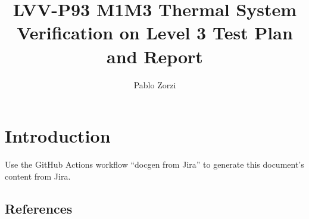 \documentclass[DM,lsstdraft,toc]{lsstdoc}
\begin{document}
\def\milestoneName{M1M3 Thermal System Verification on Level 3}
\def\milestoneId{LVV-P93}
\def\product{Data Management}


\title{LVV-P93 M1M3 Thermal System Verification on Level 3 Test Plan and Report}
\setDocRef{\lsstDocType-\lsstDocNum}
\date{\vcsDate}
\author{Pablo Zorzi}




\maketitle

\section{Introduction}
Use the GitHub Actions workflow ``docgen from Jira'' to generate this document's content from Jira.

\subsection{References}
\label{sect:references}
\renewcommand{\refname}{}




\end{document}
